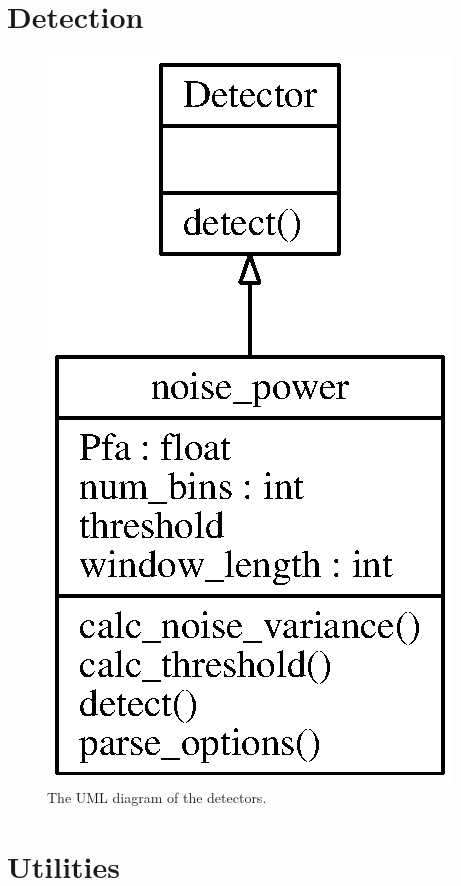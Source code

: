 \documentclass[a4paper, openany, oneside]{memoir}
\begin{document}
\section{Detection}
\label{sec:detection}

\begin{figure}
    \centering
    \includegraphics[width=\linewidth]{./figures/classes_detection.eps}
    \caption{The UML diagram of the detectors.}
    \label{fig:umldetector}
\end{figure}

\section{Utilities}
\label{sec:utilities}
\end{document}
